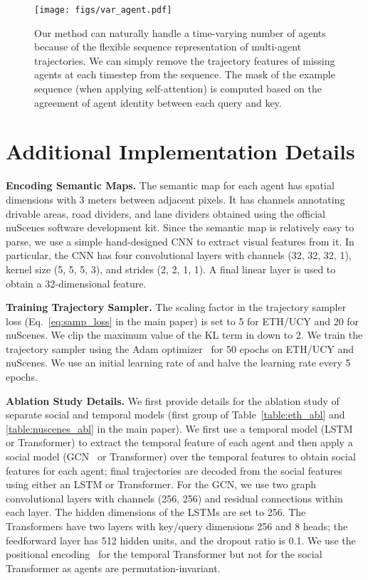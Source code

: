 \documentclass[10pt,twocolumn,letterpaper]{article}
\begin{document}
\begin{figure*}[h]
    \centering
    \texttt{[image: figs/var\_agent.pdf]}
    \caption{Our method can naturally handle a time-varying number of agents because of the flexible sequence representation of multi-agent trajectories. We can simply remove the trajectory features of missing agents at each timestep from the sequence. The mask  of the example sequence (when applying self-attention) is computed based on the agreement of agent identity between each query and key.}
    \label{fig:var_agent}
    \vspace{-2mm}
\end{figure*}

\section{Additional Implementation Details}
\label{sec:supp_details}
\noindent\textbf{Encoding Semantic Maps.}
The semantic map  for each agent  has spatial dimensions  with 3 meters between adjacent pixels. It has  channels annotating drivable areas, road dividers, and lane dividers obtained using the official nuScenes software development kit. Since the semantic map is relatively easy to parse, we use a simple hand-designed CNN to extract visual features  from it. In particular, the CNN has four convolutional layers with channels (32, 32, 32, 1), kernel size (5, 5, 5, 3), and strides (2, 2, 1, 1). A final linear layer is used to obtain a 32-dimensional feature.


\vspace{2mm}
\noindent\textbf{Training Trajectory Sampler.}
The scaling factor  in the trajectory sampler loss  (Eq.~\eqref{eq:samp_loss} in the main paper) is set to 5 for ETH/UCY and 20 for nuScenes. We clip the maximum value of the KL term in  down to 2. We train the trajectory sampler using the Adam optimizer~\cite{kingma2014adam} for 50 epochs on ETH/UCY and nuScenes. We use an initial learning rate of  and halve the learning rate every 5 epochs.


\vspace{2mm}
\noindent\textbf{Ablation Study Details.}
We first provide details for the ablation study of separate social and temporal models (first group of Table~\ref{table:eth_abl} and \ref{table:nuscenes_abl} in the main paper). We first use a temporal model (LSTM or Transformer) to extract the temporal feature of each agent and then apply a social model (GCN~\cite{kipf2016semi} or Transformer) over the temporal features to obtain social features for each agent; final trajectories are decoded from the social features using either an LSTM or Transformer. For the GCN, we use two graph convolutional layers with channels (256, 256) and residual connections within each layer. The hidden dimensions of the LSTMs are set to 256. The Transformers have two layers with key/query dimensions 256 and 8 heads; the feedforward layer has 512 hidden units, and the dropout ratio is 0.1. We use the positional encoding~\cite{vaswani2017attention} for the temporal Transformer but not for the social Transformer as agents are permutation-invariant.
\end{document}
